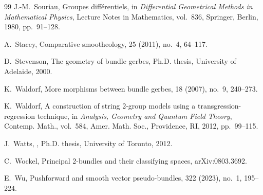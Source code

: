 \documentclass[11pt]{amsart}
\begin{document}
\begin{thebibliography}{99}
J.-M.~Souriau,
\newblock Groupes diff\'erentiels,
\newblock in {\em Differential Geometrical Methods in Mathematical Physics},
\newblock Lecture Notes in Mathematics, vol.~836,
\newblock Springer, Berlin, 1980, pp.~91--128.

A.~Stacey,
\newblock Comparative smootheology,
 25 (2011), no.~4, 64--117.

D.~Stevenson,
\newblock The geometry of bundle gerbes,
\newblock Ph.D. thesis, University of Adelaide, 2000.

K.~Waldorf,
\newblock More morphisms between bundle gerbes,
 18 (2007), no.~9, 240--273.

K.~Waldorf,
\newblock A construction of string 2-group models using a transgression-regression technique,
\newblock in {\em Analysis, Geometry and Quantum Field Theory},
\newblock Contemp. Math., vol.~584,
\newblock Amer. Math. Soc., Providence, RI, 2012, pp.~99--115.

J.~Watts,
,
\newblock Ph.D. thesis, University of Toronto, 2012.

C.~Wockel,
\newblock Principal 2-bundles and their classifying spaces,
\newblock arXiv:0803.3692.

E.~Wu,
\newblock Pushforward and smooth vector pseudo-bundles,
 322 (2023), no.~1, 195--224.

\end{thebibliography}
\end{document}
